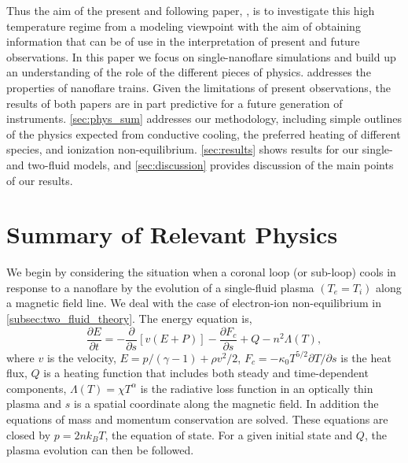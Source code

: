 \documentclass[iop]{emulateapj}
\begin{document}
%
	\par Thus the aim of the present and following paper, \citet[in preparation]{barnes_inference_2016-1} , is to investigate this high temperature regime from a modeling viewpoint with the aim of obtaining information that can be of use in the interpretation of present and future observations. In this paper we focus on single-nanoflare simulations and build up an understanding of the role of the different pieces of physics.  addresses the properties of nanoflare trains. Given the limitations of present observations, the results of both papers are in part predictive for a future generation of instruments. \autoref{sec:phys_sum} addresses our methodology, including simple outlines of the physics expected from conductive cooling, the preferred heating of different species, and ionization non-equilibrium. \autoref{sec:results} shows results for our single- and two-fluid models, and \autoref{sec:discussion} provides discussion of the main points of our results.
	\section{Summary of Relevant Physics}
	\label{sec:phys_sum}
	\par We begin by considering the situation when a coronal loop (or sub-loop) cools in response to a nanoflare by the evolution of a single-fluid plasma $(T_e = T_i)$ along a magnetic field line. We deal with the case of electron-ion non-equilibrium in  \autoref{subsec:two_fluid_theory}. The energy equation is,
	\begin{equation}
		\label{eq:energy_1d}
		\frac{\partial E}{\partial t} = -\frac{\partial}{\partial s}[v(E+P)] - \frac{\partial F_c}{\partial s} + Q - n^2\Lambda(T),
	\end{equation}
where $v$ is the velocity, $E=p/(\gamma -1) + \rho v^2/2$, $F_c=-\kappa_0 T^{5/2}\partial T/\partial s$ is the heat flux, $Q$ is a heating function that includes both steady and time-dependent components, $\Lambda(T)=\chi T^{\alpha}$ is the radiative loss function in an optically thin plasma \citep[e.g.][]{klimchuk_highly_2008} and $s$ is a spatial coordinate along the magnetic field. In addition the equations of mass and momentum conservation are solved. These equations are closed by $p=2nk_BT$, the equation of state. For a given initial state and $Q$, the plasma evolution can then be followed. 
\end{document}
